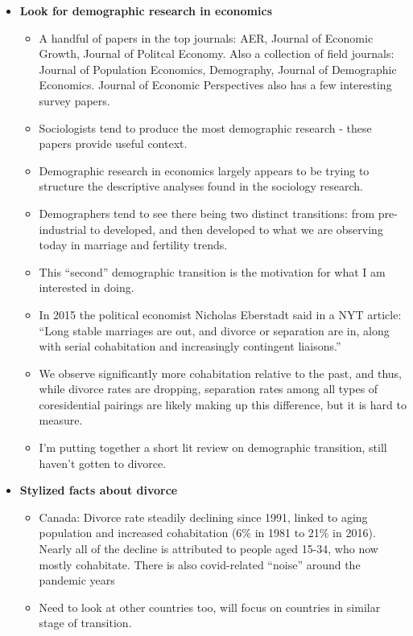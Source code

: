 \documentclass{article}
\begin{document}
\begin{itemize}
\item \textbf{Look for demographic research in economics}
\begin{itemize}
\item A handful of papers in the top journals: AER, Journal of Economic Growth, Journal of Politcal Economy. Also a collection of field journals: Journal of Population Economics, Demography, Journal of Demographic Economics. Journal of Economic Perspectives also has a few interesting survey papers.
\item Sociologists tend to produce the most demographic research - these papers provide useful context. 
\item Demographic research in economics largely appears to be trying to structure the descriptive analyses found in the sociology research.
\item Demographers tend to see there being two distinct transitions: from pre-industrial to developed, and then developed to what we are observing today in marriage and fertility trends.
\item This ``second'' demographic transition is the motivation for what I am interested in doing.
\item In 2015 the political economist Nicholas Eberstadt said in a NYT article: ``Long stable marriages are out, and divorce or separation are in, along with serial cohabitation and increasingly contingent liaisons.''
\item We observe significantly more cohabitation relative to the past, and thus, while divorce rates are dropping, separation rates among all types of coresidential pairings are likely making up this difference, but it is hard to measure. 
\item I'm putting together a short lit review on demographic transition, still haven't gotten to divorce.
\end{itemize}


\item \textbf{Stylized facts about divorce}
\begin{itemize}
\item Canada: Divorce rate steadily declining since 1991, linked to aging population and increased cohabitation (6\% in 1981 to 21\% in 2016). Nearly all of the decline is attributed to people aged 15-34, who now mostly cohabitate. There is also covid-related ``noise'' around the pandemic years
\item Need to look at other countries too, will focus on countries in similar stage of transition.
\end{itemize}


\end{itemize}
\end{document}
